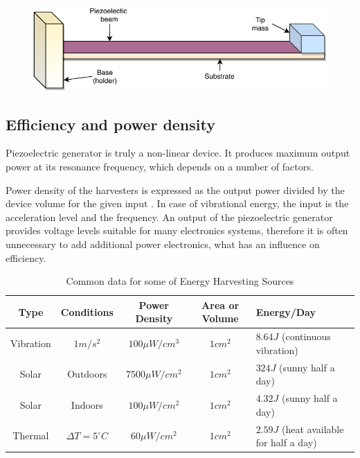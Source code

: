 \documentclass[12pt,a4paper]{article}
\begin{document}
\begin{figure}[ht!]
\includegraphics[scale=1]{beam1.pdf}
\end{figure}

\subsection{Efficiency and power density}
Piezoelectric generator is truly a non-linear device. It produces maximum output power at its resonance frequency, which depends on a number of factors. 
\par
Power density of the harvesters is expressed as the output power divided by the device volume for the given input \cite{EnHv2}. In case of vibrational energy, the input is the acceleration level and the frequency. An output of the piezoelectric generator provides voltage levels suitable for many electronics systems, therefore it is often unnecessary to add additional power electronics, what has an influence on efficiency.
\par
\begin{table}[ht]
\small
\begin{center} 
\begin{tabular}{|c|c|c|c|l|}
\hline 
\textbf{Type} & \textbf{Conditions} & \textbf{Power Density} & \textbf{Area or Volume} & \textbf{Energy/Day} \\ 
\hline 
\hline
Vibration & $1m/s^2$ & $100\mu W/cm^3$ & $1cm^2$ & $8.64J$ (continuous vibration) \\ 
\hline 
Solar & Outdoors & $7500\mu W/cm^2$ & $1cm^2$ & $324J$ (sunny half a day) \\ 
\hline 
Solar & Indoors & $100\mu W/cm^2$ & $1cm^2$ & $4.32J$ (sunny half a day) \\ 
\hline 
Thermal & $\Delta T = 5 ^{\circ} C$ & $60\mu W/cm^2$ & $1cm^2$ & $2.59J$ (heat available for half a day) \\ 
\hline 
\end{tabular} 
\end{center}
\caption{Common data for some of Energy Harvesting Sources \cite{EnHv1}}
\label{tab:typdat}
\end{table}
\par
\end{document}
